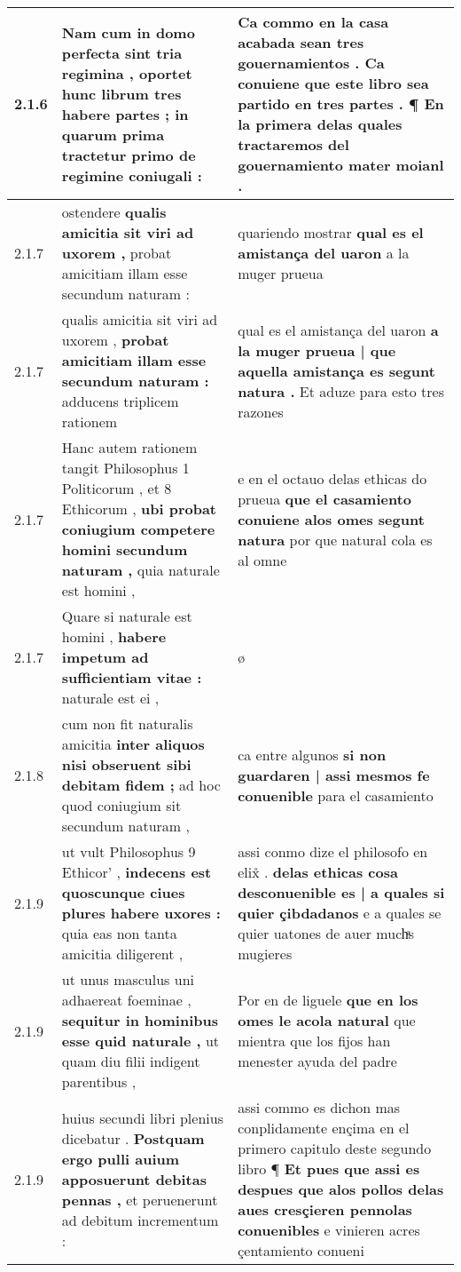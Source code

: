\begin{tabular}{|p{1cm}|p{6.5cm}|p{6.5cm}|}
2.1.6 & Nam cum in domo perfecta sint tria regimina , \textbf{ oportet hunc librum tres habere partes ; } in quarum prima tractetur primo de regimine coniugali : & Ca commo en la casa acabada sean tres gouernamientos . \textbf{ Ca conuiene que este libro sea partido en tres partes . } ¶ En la primera delas quales tractaremos del gouernamiento mater moianl . \\\hline
2.1.7 & ostendere \textbf{ qualis amicitia sit viri ad uxorem , } probat amicitiam illam esse secundum naturam : & quariendo mostrar \textbf{ qual es el amistança del uaron } a la muger prueua \\\hline
2.1.7 & qualis amicitia sit viri ad uxorem , \textbf{ probat amicitiam illam esse secundum naturam : } adducens triplicem rationem & qual es el amistança del uaron \textbf{ a la muger prueua | que aquella amistança es segunt natura . } Et aduze para esto tres razones \\\hline
2.1.7 & Hanc autem rationem tangit Philosophus 1 Politicorum , et 8 Ethicorum , \textbf{ ubi probat coniugium competere homini secundum naturam , } quia naturale est homini , & e en el octauo delas ethicas do prueua \textbf{ que el casamiento conuiene alos omes segunt natura } por que natural cola es al omne \\\hline
2.1.7 & Quare si naturale est homini , \textbf{ habere impetum ad sufficientiam vitae : } naturale est ei , & ø \\\hline
2.1.8 & cum non fit naturalis amicitia \textbf{ inter aliquos nisi obseruent sibi debitam fidem ; } ad hoc quod coniugium sit secundum naturam , & ca entre algunos \textbf{ si non guardaren | assi mesmos fe conuenible } para el casamiento \\\hline
2.1.9 & ut vult Philosophus 9 Ethicor’ , \textbf{ indecens est quoscunque ciues plures habere uxores : } quia eas non tanta amicitia diligerent , & assi conmo dize el philosofo en elix̊ . \textbf{ delas ethicas cosa desconuenible es | a quales si quier çibdadanos } e a quales se quier uatones de auer muchͣs mugieres \\\hline
2.1.9 & ut unus masculus uni adhaereat foeminae , \textbf{ sequitur in hominibus esse quid naturale , } ut quam diu filii indigent parentibus , & Por en de liguele \textbf{ que en los omes le acola natural } que mientra que los fijos han menester ayuda del padre \\\hline
2.1.9 & huius secundi libri plenius dicebatur . \textbf{ Postquam ergo pulli auium apposuerunt debitas pennas , } et peruenerunt ad debitum incrementum : & assi commo es dichon mas conplidamente ençima en el primero capitulo deste segundo libro ¶ \textbf{ Et pues que assi es despues que alos pollos delas aues cresçieren pennolas conuenibles } e vinieren acres çentamiento conueni \\\hline

\end{tabular}
